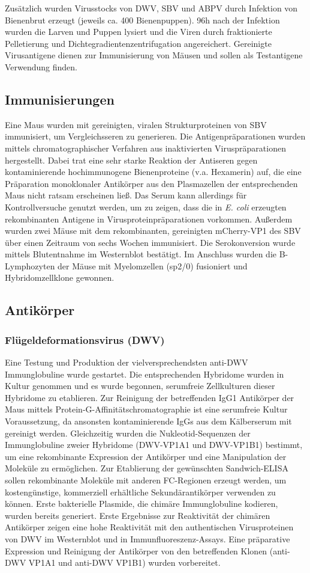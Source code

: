 Zusätzlich wurden Virusstocks von DWV, SBV und ABPV durch Infektion von Bienenbrut erzeugt (jeweils ca. 400 Bienenpuppen). 96h nach der Infektion wurden die Larven und Puppen lysiert und die Viren durch fraktionierte Pelletierung und Dichtegradientenzentrifugation angereichert. Gereinigte Virusantigene dienen zur Immunisierung von Mäusen und sollen als Testantigene Verwendung finden. 

\subsection{Immunisierungen}
Eine Maus wurden mit gereinigten, viralen Strukturproteinen von SBV immunisiert, um Vergleichsseren zu generieren. Die Antigenpräparationen wurden mittels chromatographischer Verfahren aus inaktivierten Viruspräparationen hergestellt. Dabei trat eine sehr starke Reaktion der Antiseren gegen kontaminierende hochimmunogene Bienenproteine (v.a. Hexamerin) auf, die eine Präparation monoklonaler Antikörper aus den Plasmazellen der entsprechenden Maus nicht ratsam erscheinen ließ. Das Serum kann allerdings für Kontrollversuche genutzt werden, um zu zeigen, dass die in \textit{E. coli} erzeugten rekombinanten Antigene in Virusproteinpräparationen vorkommen. 
Außerdem wurden zwei Mäuse mit dem rekombinanten, gereinigten mCherry-VP1 des SBV über einen Zeitraum von sechs Wochen immunisiert. Die Serokonversion wurde mittels Blutentnahme im Westernblot bestätigt. Im Anschluss wurden die B-Lymphozyten der Mäuse mit Myelomzellen (sp2/0) fusioniert und Hybridomzellklone gewonnen. 

\subsection{Antikörper}
\subsubsection{Flügeldeformationsvirus (DWV)}
Eine Testung und Produktion der vielversprechendsten anti-DWV Immunglobuline wurde gestartet. Die entsprechenden Hybridome wurden in Kultur genommen und es wurde begonnen, serumfreie Zellkulturen dieser Hybridome zu etablieren. Zur Reinigung der betreffenden IgG1 Antikörper der Maus mittels Protein-G-Affinitätschromatographie ist eine serumfreie Kultur Voraussetzung, da ansonsten kontaminierende IgGs aus dem Kälberserum mit gereinigt werden. Gleichzeitig wurden die Nukleotid-Sequenzen der Immunglobuline zweier Hybridome (DWV-VP1A1 und DWV-VP1B1) bestimmt, um eine rekombinante Expression der Antikörper und eine Manipulation der Moleküle zu ermöglichen. Zur Etablierung der gewünschten Sandwich-ELISA sollen rekombinante Moleküle mit anderen FC-Regionen erzeugt werden, um kostengünstige, kommerziell erhältliche Sekundärantikörper verwenden zu können. Erste bakterielle Plasmide, die chimäre Immunglobuline kodieren, wurden bereits generiert. Erste Ergebnisse zur Reaktivität der chimären Antikörper zeigen eine hohe Reaktivität mit den authentischen Virusproteinen von DWV im Westernblot und in Immunfluoreszenz-Assays. Eine präparative Expression und Reinigung der Antikörper von den betreffenden Klonen (anti-DWV VP1A1 und anti-DWV VP1B1) wurden vorbereitet.
